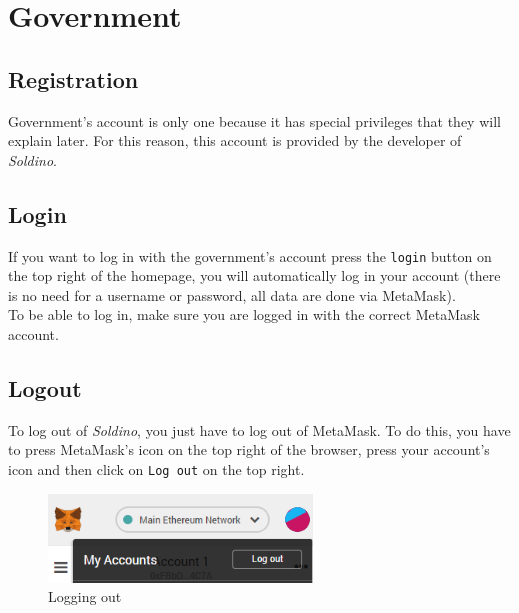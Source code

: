 \section{Government}
	\subsection{Registration}
	Government's account is only one because it has special privileges that
	they will explain later. For this reason, this account is provided 
	by the developer of \textit{Soldino}.
	\subsection{Login}
	If you want to log in with the government's account press the \texttt{login} button on the 
	top right of the homepage, you will automatically log in your account 
	(there is no need for a username or password, all data are done via MetaMask). 
	\\To be able to log in, make sure you are logged in with the correct MetaMask\glosp 
	account.
	\subsection{Logout}
	To log out of \textit{Soldino}, you just have to log out of 
	MetaMask\glosp. To do this, you have to press MetaMask's icon on the top 
	right of the browser, press your account's icon and then click on \texttt{Log out}
	on the top right.
	\begin{figure}[H]
		\includegraphics[width=7cm]{res/images/logout_metamask.png}
		\centering
		\caption{Logging out}
	\end{figure}
\pagebreak
